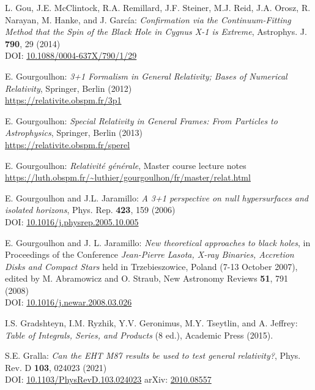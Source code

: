\begin{thebibliography}{123}
L. Gou, J.E. McClintock, R.A. Remillard, J.F. Steiner, M.J. Reid, J.A. Orosz, R. Narayan, M. Hanke, and J. García:
{\em Confirmation via the Continuum-Fitting Method that the Spin of the Black Hole in Cygnus X-1 is Extreme},
Astrophys. J. {\bf 790}, 29 (2014)\\
DOI: \href{https://doi.org/10.1088/0004-637X/790/1/29}{10.1088/0004-637X/790/1/29}

E. Gourgoulhon: {\em 3+1 Formalism in General Relativity; Bases of Numerical Relativity},
Springer, Berlin (2012)\\
\url{https://relativite.obspm.fr/3p1}

E. Gourgoulhon: {\em Special Relativity in General Frames: From Particles to Astrophysics},
Springer, Berlin (2013) \\
\url{https://relativite.obspm.fr/sperel}

E. Gourgoulhon: {\em Relativit\'e g\'en\'erale},
Master course lecture notes\\
\url{https://luth.obspm.fr/~luthier/gourgoulhon/fr/master/relat.html}

E. Gourgoulhon and J.L. Jaramillo: {\em A 3+1 perspective on null hypersurfaces and isolated horizons},
Phys. Rep. {\bf 423}, 159 (2006)\\
DOI: \href{https://doi.org/10.1016/j.physrep.2005.10.005}{10.1016/j.physrep.2005.10.005}

E. Gourgoulhon and J. L. Jaramillo: {\em New theoretical approaches to black holes},
in Proceedings of the Conference {\em Jean-Pierre Lasota, X-ray Binaries, Accretion Disks and Compact Stars} held in Trzebieszowice, Poland (7-13 October 2007), edited by M. Abramowicz and O. Straub, New Astronomy Reviews {\bf 51}, 791 (2008) \\
DOI: \href{https://doi.org/10.1016/j.newar.2008.03.026}{10.1016/j.newar.2008.03.026}

I.S. Gradshteyn, I.M. Ryzhik, Y.V. Geronimus, M.Y. Tseytlin, and A. Jeffrey:
{\em  Table of Integrals, Series, and Products} (8 ed.),
Academic Press (2015).

S.E. Gralla:
{\em Can the EHT M87 results be used to test general relativity?},
Phys. Rev. D {\bf 103}, 024023 (2021)\\
DOI: \href{https://doi.org/10.1103/PhysRevD.103.024023}{10.1103/PhysRevD.103.024023}\hfill
arXiv: \href{https://arxiv.org/abs/2010.08557}{2010.08557}


\end{thebibliography}
